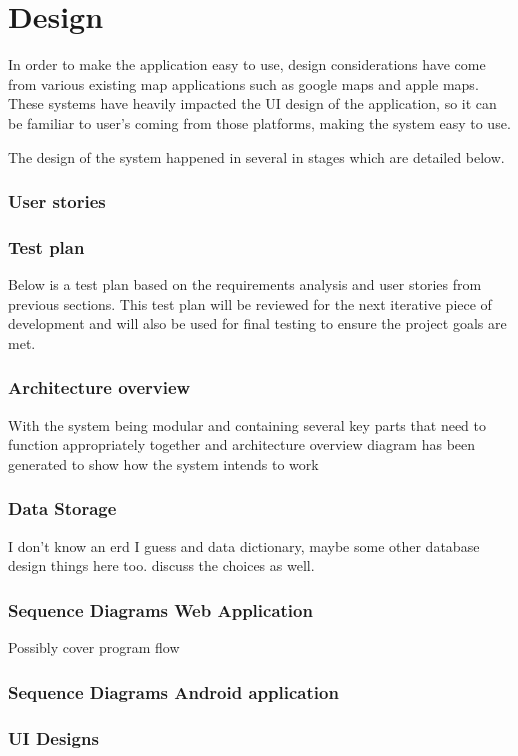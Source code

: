 \section{Design}
In order to make the application easy to use, design considerations have come from various existing map applications such as google maps and apple maps. These systems have heavily impacted the UI design of the application, so it can be familiar to user's coming from those platforms, making the system easy to use.

The design of the system happened in several in stages which are detailed below.

\subsubsection{User stories}
\subsubsection{Test plan}
Below is a test plan based on the requirements analysis and user stories from previous sections. This test plan will be reviewed for the next iterative piece of development and will also be used for final testing to ensure the project goals are met.

\subsubsection{Architecture overview}
With the system being modular and containing several key parts that need to function appropriately together and architecture overview diagram has been generated to show how the system intends to work

\subsubsection{Data Storage}
I don't know an erd I guess and data dictionary, maybe some other database design things here too. discuss the choices as well.
\subsubsection{Sequence Diagrams Web Application}
Possibly cover program flow

\subsubsection{Sequence Diagrams Android application}
\subsubsection{UI Designs}